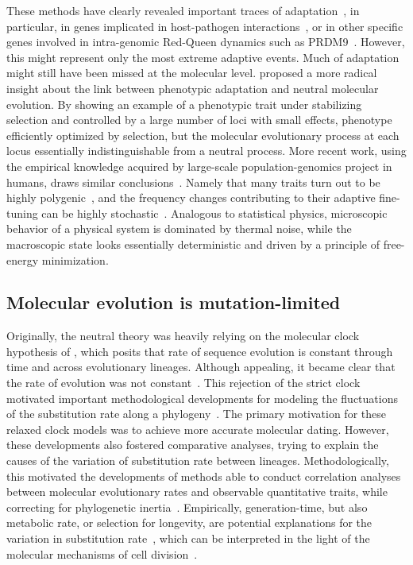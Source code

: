 These methods have clearly revealed important traces of adaptation~\citep{Bustamante2005, Halligan2010, Enard2014}, in particular, in genes implicated in host-pathogen interactions~\citep{Enard2016, Grandaubert2019}, or in other specific genes involved in intra-genomic Red-Queen dynamics such as PRDM9~\citep{Thomas2009,Oliver2009,Ponting2011}.
However, this might represent only the most extreme adaptive events.
Much of adaptation might still have been missed at the molecular level.
\citet{kimura1983neutral} proposed a more radical insight about the link between phenotypic adaptation and neutral molecular evolution.
By showing an example of a phenotypic trait under stabilizing selection and controlled by a large number of loci with small effects, phenotype efficiently optimized by selection, but the molecular evolutionary process at each locus essentially indistinguishable from a neutral process.
More recent work, using the empirical knowledge acquired by large-scale population-genomics project in humans, draws similar conclusions~\citep{Simons2018}.
Namely that many traits turn out to be highly polygenic~\citep{Pritchard2002}, and the frequency changes contributing to their adaptive fine-tuning can be highly stochastic~\citep{Sella2019}.
Analogous to statistical physics, microscopic behavior of a physical system is dominated by thermal noise, while the macroscopic state looks essentially deterministic and driven by a principle of free-energy minimization.

\subsection{Molecular evolution is mutation-limited}
\label{subsec:molecular-evolution-is-mutation-limited}

Originally, the neutral theory was heavily relying on the molecular clock hypothesis of \citet{Zuckerkandl1965}, which posits that rate of sequence evolution is constant through time and across evolutionary lineages.
Although appealing, it became clear that the rate of evolution was not constant~\citep{ChungWu1985, Li1987, Bulmer1991, Gaut1992}.
This rejection of the strict clock motivated important methodological developments for modeling the fluctuations of the substitution rate along a phylogeny~\citep{Sanderson1997, Thorne1998, Kishino2001, Aris-Brosou2002, Drummond2006, Lepage2007}.
The primary motivation for these relaxed clock models was to achieve more accurate molecular dating.
However, these developments also fostered comparative analyses, trying to explain the causes of the variation of substitution rate between lineages.
Methodologically, this motivated the developments of methods able to conduct correlation analyses between molecular evolutionary rates and observable quantitative traits, while correcting for phylogenetic inertia~\citep{Lanfear2010a, Lartillot2011}.
Empirically, generation-time, but also metabolic rate, or selection for longevity, are potential explanations for the variation in substitution rate~\citep{Lartillot2012}, which can be interpreted in the light of the molecular mechanisms of cell division~\citep{Gao2016}.


